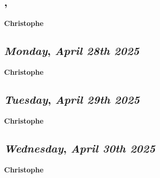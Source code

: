 \subsection*{\weekday, \day}
\textbf {Christophe}

\def\day{\textit{April 28th 2025}}
\def\weekday{\textit{Monday}}
\subsection*{\weekday, \day}
\textbf {Christophe}

\def\day{\textit{April 29th 2025}}
\def\weekday{\textit{Tuesday}}
\subsection*{\weekday, \day}
\textbf {Christophe}

\def\day{\textit{April 30th 2025}}
\def\weekday{\textit{Wednesday}}
\subsection*{\weekday, \day}
\textbf {Christophe}
